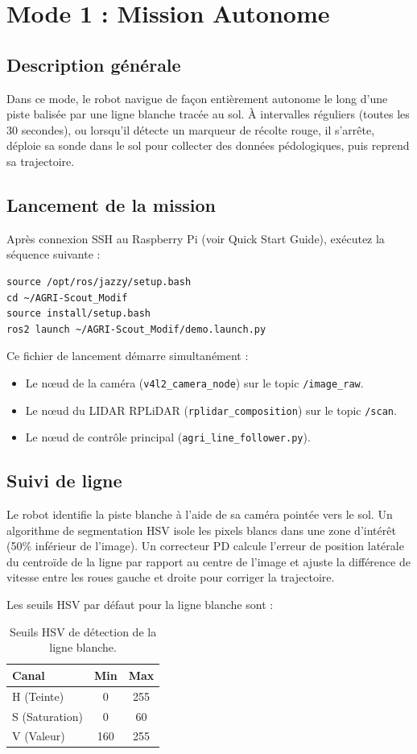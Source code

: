 \documentclass [12pt, a4paper]{article}
\begin{document}
\section{Mode 1 : Mission Autonome}

\subsection{Description générale}
Dans ce mode, le robot navigue de façon entièrement autonome le long d'une piste balisée par une ligne blanche tracée au sol. À intervalles réguliers (toutes les 30 secondes), ou lorsqu'il détecte un marqueur de récolte rouge, il s'arrête, déploie sa sonde dans le sol pour collecter des données pédologiques, puis reprend sa trajectoire.

\subsection{Lancement de la mission}
Après connexion SSH au Raspberry Pi (voir Quick Start Guide), exécutez la séquence suivante :
\begin{verbatim}
source /opt/ros/jazzy/setup.bash
cd ~/AGRI-Scout_Modif
source install/setup.bash
ros2 launch ~/AGRI-Scout_Modif/demo.launch.py
\end{verbatim}

Ce fichier de lancement démarre simultanément :
\begin{itemize}
    \item Le nœud de la caméra (\texttt{v4l2\_camera\_node}) sur le topic \texttt{/image\_raw}.
    \item Le nœud du LIDAR RPLiDAR (\texttt{rplidar\_composition}) sur le topic \texttt{/scan}.
    \item Le nœud de contrôle principal (\texttt{agri\_line\_follower.py}).
\end{itemize}

\subsection{Suivi de ligne}
Le robot identifie la piste blanche à l'aide de sa caméra pointée vers le sol. Un algorithme de segmentation HSV isole les pixels blancs dans une zone d'intérêt (50\% inférieur de l'image). Un correcteur PD calcule l'erreur de position latérale du centroïde de la ligne par rapport au centre de l'image et ajuste la différence de vitesse entre les roues gauche et droite pour corriger la trajectoire.

Les seuils HSV par défaut pour la ligne blanche sont :
\begin{table}[H]
\centering
\begin{tabular}{lcc}
\toprule
\textbf{Canal} & \textbf{Min} & \textbf{Max} \\
\midrule
H (Teinte) & 0 & 255 \\
S (Saturation) & 0 & 60 \\
V (Valeur) & 160 & 255 \\
\bottomrule
\end{tabular}
\caption{Seuils HSV de détection de la ligne blanche.}
\end{table}
\end{document}
